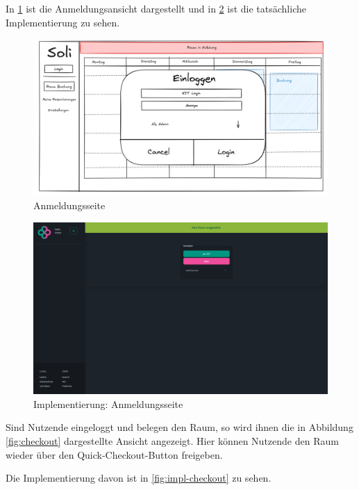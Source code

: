 In \ref{fig:login} ist die Anmeldungsansicht dargestellt und in \ref{fig:impl-login} ist die tatsächliche Implementierung zu sehen.

\begin{figure}[ht]
    \centering
    \includegraphics[width=\textwidth]{figures/mockup/auth_login}
    \caption{Anmeldungsseite}
    \label{fig:login}
\end{figure}
\clearpage

\begin{figure}[ht]
    \centering
    \includegraphics[width=\textwidth]{figures/impl-views/auth_login}
    \caption{Implementierung: Anmeldungsseite}
    \label{fig:impl-login}
\end{figure}
\clearpage

Sind Nutzende eingeloggt und belegen den Raum,
so wird ihnen die in Abbildung \ref{fig:checkout} dargestellte Ansicht angezeigt.
Hier können Nutzende den Raum wieder über den Quick-Checkout-Button freigeben.

Die Implementierung davon ist in \ref{fig:impl-checkout} zu sehen.


